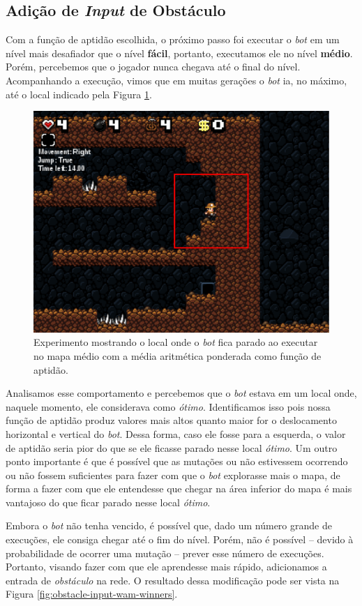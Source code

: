 \subsection{Adição de \textit{Input} de Obstáculo}

Com a função de aptidão escolhida, o próximo passo foi executar o \textit{bot}
em um nível mais desafiador que o nível \textbf{fácil}, portanto, executamos
ele no nível \textbf{médio}. Porém, percebemos que o jogador nunca chegava até
o final do nível. Acompanhando a execução, vimos que em muitas gerações o
\textit{bot} ia, no máximo, até o local indicado pela Figura
\ref{fig:experiment-medium-stuck}.

\begin{figure}[htb!]
\centering
\includegraphics[width=.5\textwidth]{fig/experiment-medium-stuck.pdf}
\caption{Experimento mostrando o local onde o \textit{bot} fica parado ao
    executar no mapa médio com a média aritmética ponderada como função de
    aptidão.}
\label{fig:experiment-medium-stuck}
\end{figure}

Analisamos esse comportamento e percebemos que o \textit{bot} estava em um
local onde, naquele momento, ele considerava como \textit{ótimo}. Identificamos
isso pois nossa função de aptidão produz valores mais altos quanto maior for o
deslocamento horizontal e vertical do \textit{bot}. Dessa forma, caso ele fosse
para a esquerda, o valor de aptidão seria pior do que se ele ficasse parado
nesse local \textit{ótimo}. Um outro ponto importante é que é possível que as
mutações ou não estivessem ocorrendo ou não fossem suficientes para fazer com
que o \textit{bot} explorasse mais o mapa, de forma a fazer com que ele
entendesse que chegar na área inferior do mapa é mais vantajoso do que ficar
parado nesse local \textit{ótimo}.


Embora o \textit{bot} não tenha vencido, é possível que, dado um número grande
de execuções, ele consiga chegar até o fim do nível. Porém, não é possível --
devido à probabilidade de ocorrer uma mutação -- prever esse número de
execuções. Portanto, visando fazer com que ele aprendesse mais rápido,
adicionamos a entrada de \textit{obstáculo} na rede. O resultado dessa
modificação pode ser vista na Figura \ref{fig:obstacle-input-wam-winners}.

